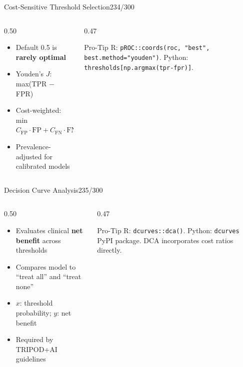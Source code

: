\documentclass[10pt]{beamer}
\newcommand{\smark}[1]{\hfill{\scriptsize\color{codegray}#1}}
\begin{document}
\begin{frame}{Cost-Sensitive Threshold Selection}\smark{234/300}
\begin{columns}[T]
\begin{column}{0.50\textwidth}
\begin{itemize}
    \item Default 0.5 is \textbf{rarely optimal}
    \item Youden's $J$: max(TPR $-$ FPR)
    \item Cost-weighted: min $C_{\text{FP}} \cdot \text{FP} + C_{\text{FN}} \cdot \text{FN}$
    \item Prevalence-adjusted for calibrated models
\end{itemize}
\end{column}
\begin{column}{0.47\textwidth}
\begin{alertblock}{Pro-Tip}
    \scriptsize R: \texttt{pROC::coords(roc, "best", best.method="youden")}. Python: \texttt{thresholds[np.argmax(tpr-fpr)]}.
\end{alertblock}
\end{column}
\end{columns}
\end{frame}

\begin{frame}{Decision Curve Analysis}\smark{235/300}
\begin{columns}[T]
\begin{column}{0.50\textwidth}
\begin{itemize}
    \item Evaluates clinical \textbf{net benefit} across thresholds
    \item Compares model to ``treat all'' and ``treat none''
    \item $x$: threshold probability; $y$: net benefit
    \item Required by TRIPOD+AI guidelines
\end{itemize}
\end{column}
\begin{column}{0.47\textwidth}
\begin{alertblock}{Pro-Tip}
    \scriptsize R: \texttt{dcurves::dca()}. Python: \texttt{dcurves} PyPI package. DCA incorporates cost ratios directly.
\end{alertblock}
\end{column}
\end{columns}
\end{frame}
\end{document}
